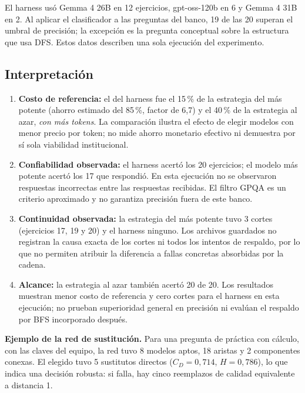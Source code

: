\documentclass[12pt,letterpaper]{article}
\begin{document}
El harness usó Gemma 4 26B en 12 ejercicios, gpt-oss-120b en 6 y Gemma 4 31B en 2. Al aplicar el clasificador a las preguntas del banco, 19 de las 20 superan el umbral de precisión; la excepción es la pregunta conceptual sobre la estructura que usa DFS. Estos datos describen una sola ejecución del experimento.

\subsection{Interpretación}
\begin{enumerate}[nosep]
  \item \textbf{Costo de referencia:} el del harness fue el 15\,\% de la estrategia del más potente (ahorro estimado del 85\,\%, factor de 6,7) y el 40\,\% de la estrategia al azar, \emph{con más tokens}. La comparación ilustra el efecto de elegir modelos con menor precio por token; no mide ahorro monetario efectivo ni demuestra por sí sola viabilidad institucional.
  \item \textbf{Confiabilidad observada:} el harness acertó los 20 ejercicios; el modelo más potente acertó los 17 que respondió. En esta ejecución no se observaron respuestas incorrectas entre las respuestas recibidas. El filtro GPQA es un criterio aproximado y no garantiza precisión fuera de este banco.
  \item \textbf{Continuidad observada:} la estrategia del más potente tuvo 3 cortes (ejercicios 17, 19 y 20) y el harness ninguno. Los archivos guardados no registran la causa exacta de los cortes ni todos los intentos de respaldo, por lo que no permiten atribuir la diferencia a fallas concretas absorbidas por la cadena.
  \item \textbf{Alcance:} la estrategia al azar también acertó 20 de 20. Los resultados muestran menor costo de referencia y cero cortes para el harness en esta ejecución; no prueban superioridad general en precisión ni evalúan el respaldo por BFS incorporado después.
\end{enumerate}

\textbf{Ejemplo de la red de sustitución.} Para una pregunta de práctica con cálculo, con las claves del equipo, la red tuvo 8 modelos aptos, 18 aristas y 2 componentes conexas. El elegido tuvo 5 sustitutos directos ($C_D=0{,}714$, $H=0{,}786$), lo que indica una decisión robusta: si falla, hay cinco reemplazos de calidad equivalente a distancia 1.

\end{document}

